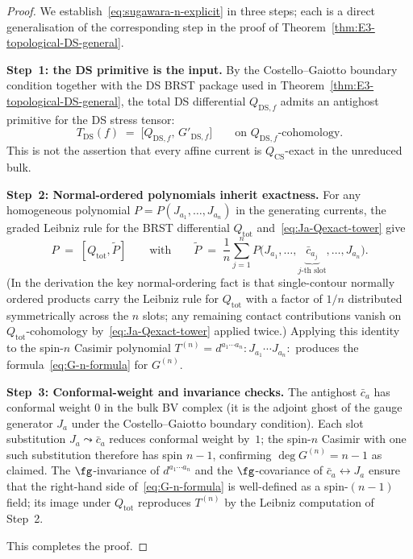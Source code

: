 \begin{proof}
We establish~\eqref{eq:sugawara-n-explicit}
in three steps; each is a direct generalisation of the corresponding
step in the proof of Theorem~\ref{thm:E3-topological-DS-general}.

\smallskip\noindent
\textbf{Step~1: the DS primitive is the input.}
By the Costello--Gaiotto boundary condition together with the DS BRST
package used in Theorem~\ref{thm:E3-topological-DS-general}, the total
DS differential \(Q_{\mathrm{DS},f}\) admits an antighost primitive
for the DS stress tensor:
\begin{equation}\label{eq:Ja-Qexact-tower}
T_{\mathrm{DS}}(f)
\;=\;\bigl[Q_{\mathrm{DS},f},\,G'_{\mathrm{DS},f}\bigr]
\qquad \text{on $Q_{\mathrm{DS},f}$-cohomology.}
\end{equation}
This is not the assertion that every affine current is
\(Q_{\mathrm{CS}}\)-exact in the unreduced bulk.

\smallskip\noindent
\textbf{Step~2: Normal-ordered polynomials inherit exactness.}
For any homogeneous polynomial $P = P(J_{a_1}, \ldots, J_{a_n})$ in the
generating currents, the graded Leibniz rule for the BRST differential
$Q_{\mathrm{tot}}$ and~\eqref{eq:Ja-Qexact-tower} give
\begin{equation}\label{eq:leibniz-tower}
P \;=\; [Q_{\mathrm{tot}}, \tilde P]
\qquad \text{with}\qquad
\tilde P
\;=\;
\frac{1}{n} \sum_{j=1}^n
P\bigl(J_{a_1},\ldots, \underbrace{\bar c_{a_j}}_{j\text{-th slot}},
\ldots, J_{a_n}\bigr).
\end{equation}
(In the derivation the key normal-ordering fact is that single-contour
normally ordered products carry the Leibniz rule for $Q_{\mathrm{tot}}$
with a factor of $1/n$ distributed symmetrically across the $n$ slots;
any remaining contact contributions vanish on
$Q_{\mathrm{tot}}$-cohomology by~\eqref{eq:Ja-Qexact-tower} applied
twice.) Applying this identity to the spin-$n$ Casimir polynomial
$T^{(n)} = d^{a_1 \cdots a_n} {:}J_{a_1}\cdots J_{a_n}{:}$ produces the
formula~\eqref{eq:G-n-formula} for $G^{(n)}$.

\smallskip\noindent
\textbf{Step~3: Conformal-weight and invariance checks.}
The antighost $\bar c_a$ has conformal weight $0$ in the bulk BV complex
(it is the adjoint ghost of the gauge generator $J_a$ under the
Costello--Gaiotto boundary condition). Each slot substitution
$J_a \leadsto \bar c_a$ reduces conformal weight by~$1$; the
spin-$n$ Casimir with one such substitution therefore has spin $n-1$,
confirming $\deg G^{(n)} = n-1$ as claimed. The $\fg$-invariance of
$d^{a_1\cdots a_n}$ and the $\fg$-covariance of
$\bar c_a \leftrightarrow J_a$ ensure that the right-hand side
of~\eqref{eq:G-n-formula} is well-defined as a spin-$(n-1)$ field; its
image under $Q_{\mathrm{tot}}$ reproduces
$T^{(n)}$ by the Leibniz computation of Step~2.

This completes the proof.
\end{proof}

